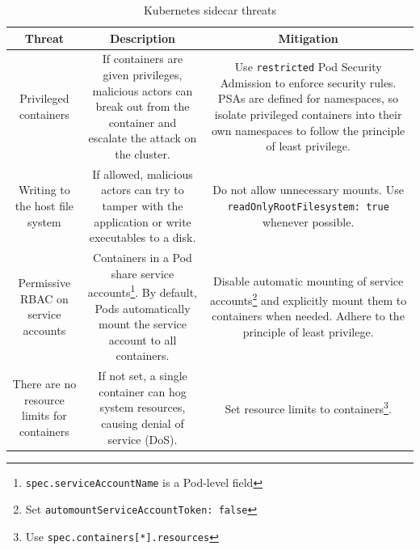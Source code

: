 \documentclass[english, 12pt, a4paper, sci, utf8, a-2b, online]{aaltothesis}
\begin{document}
\begin{table}[H]
  \sffamily
  \centering

  \caption{Kubernetes sidecar threats}
  \label{table:threat-model}

  \begin{minipage}{\textwidth}
  \renewcommand{\thempfootnote}{\arabic{mpfootnote}} %
  \begin{tabularx}{\textwidth}{CCC}
    \hline
    \textbf{Threat} & \textbf{Description} & \textbf{Mitigation} \\ \hline
    Privileged containers & If containers are given privileges, malicious actors can break out from the container and escalate the attack on the cluster. & Use \lstinline{restricted} Pod Security Admission to enforce security rules. PSAs are defined for namespaces, so isolate privileged containers into their own namespaces to follow the principle of least privilege. \\ \hline
    Writing to the host file system & If allowed, malicious actors can try to tamper with the application or write executables to a disk. & Do not allow unnecessary mounts. Use \lstinline{readOnlyRootFilesystem: true} whenever possible. \\ \hline
    Permissive RBAC on service accounts & Containers in a Pod share service accounts\footnote{\lstinline{spec.serviceAccountName} is a Pod-level field}. By default, Pods automatically mount the service account to all containers. & Disable automatic mounting of service accounts\footnote{Set \lstinline{automountServiceAccountToken: false}} and explicitly mount them to containers when needed. Adhere to the principle of least privilege. \\ \hline
    There are no resource limits for containers & If not set, a single container can hog system resources, causing denial of service (DoS). & Set resource limits to containers\footnote{Use \lstinline{spec.containers[*].resources}}. \\ \hline
  \end{tabularx}
  \end{minipage}
\end{table}
\end{document}
